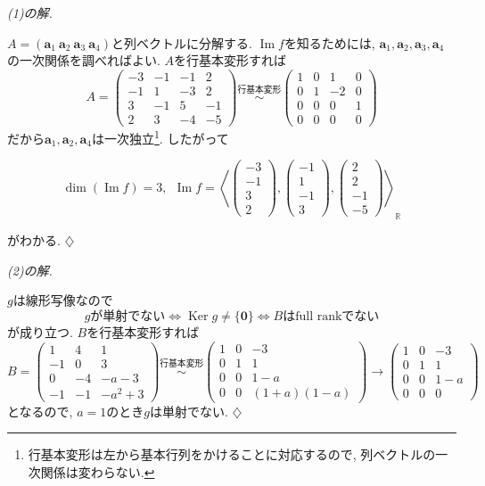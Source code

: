 \documentclass[titlepage]{jsarticle}
\numberwithin{equation}{section}
\newcommand{\R}{\mathbb{R}}%
\newcommand{\Ker}{\operatorname{Ker}}
\renewcommand{\Im}{\operatorname{Im}}
\newenvironment{kaitou}[1][解]{%
\begin{proofbox}%
\textit{#1. }\ignorespaces
}{%
\hfill$\diamondsuit$%
\end{proofbox}%
}
\begin{document}
\begin{kaitou}[(1)の解]
$A = \left(\bm{a}_1\:\bm{a}_2\:\bm{a}_3\:\bm{a}_4\right)$と列ベクトルに分解する. $\Im f$を知るためには, $\bm{a}_1, \bm{a}_2, \bm{a}_3, \bm{a}_4$の一次関係を調べればよい.
$A$を行基本変形すれば
\[
A=
\begin{pmatrix}
-3 & -1 & -1 & 2 \\
-1 & 1 & -3 & 2 \\
3 & -1 & 5 & -1 \\
2 & 3 & -4 & -5
\end{pmatrix}
\overset{\text{行基本変形}}{\sim}
\begin{pmatrix}
1 & 0 & 1 & 0\\
0 & 1 & -2 & 0\\
0 & 0 & 0 & 1\\
0 & 0 & 0 & 0
\end{pmatrix}
\]
だから$\bm{a}_1, \bm{a}_2, \bm{a}_4$は一次独立\footnote{行基本変形は左から基本行列をかけることに対応するので, 列ベクトルの一次関係は変わらない.}. したがって
\begin{answerbox}
\[
\dim\left(\Im f\right) = 3, \:\:\Im f =
\left\langle 
\begin{pmatrix}
-3\\
-1\\
3\\
2
\end{pmatrix}
,
\begin{pmatrix}
-1\\
1\\
-1\\
3
\end{pmatrix}
,
\begin{pmatrix}
2\\
2\\
-1\\
-5
\end{pmatrix}
\right\rangle_{\R}
\]
\end{answerbox}
がわかる.
\end{kaitou}
\begin{kaitou}[(2)の解]
$g$は線形写像なので
\[
g\text{が単射でない} \iff \Ker g \ne \{\bm{0}\} \iff B\text{はfull rankでない}
\]
が成り立つ. $B$を行基本変形すれば
\[
B=
\begin{pmatrix}
1 & 4 & 1 \\
-1 & 0 & 3 \\
0 & -4 & -a-3 \\
-1 & -1 & -a^2+3
\end{pmatrix}
\overset{\text{行基本変形}}{\sim}
\begin{pmatrix}
1 & 0 & -3 \\
0 & 1 & 1 \\
0 & 0 & 1 - a \\
0 & 0 & (1 + a)(1 - a)
\end{pmatrix}
\to 
\begin{pmatrix}
1 & 0 & -3 \\
0 & 1 & 1 \\
0 & 0 & 1 - a \\
0 & 0 & 0
\end{pmatrix}
\]
となるので, $\boxed{a = 1}$のとき$g$は単射でない.
\end{kaitou}
\end{document}

